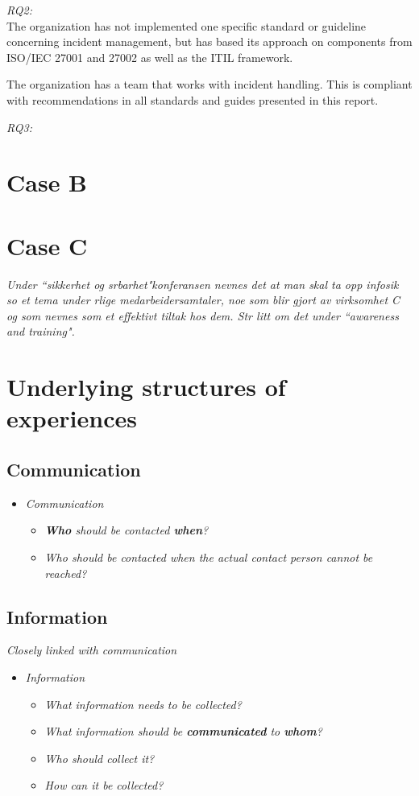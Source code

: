 \textit{RQ2:}\\
The organization has not implemented one specific standard or guideline concerning incident management, but has based its approach on components from ISO/IEC 27001 and 27002 as well as the \ac{ITIL} framework. 

The organization has a team that works with incident handling. This is compliant with recommendations in all standards and guides presented in this report.

\textit{RQ3:}\\

\section{Case B}

\section{Case C}

\textit{Under ``sikkerhet og srbarhet"konferansen nevnes det at man skal ta opp infosik so et tema under rlige medarbeidersamtaler, noe som blir gjort av virksomhet C og som nevnes som et effektivt tiltak hos dem. Str litt om det under ``awareness and training".}

\section{Underlying structures of experiences}
\subsection{Communication}
\begin{itemize}
\item \textit{Communication}
\begin{itemize}
\item \textit{\textbf{Who} should be contacted \textbf{when}?}
\item \textit{Who should be contacted when the actual contact person cannot be reached?}
\end{itemize}
\end{itemize}

\subsection{Information}
\textit{Closely linked with communication}

\begin{itemize}
\item \textit{Information}
\begin{itemize}
\item \textit{What information needs to be collected?}
\item \textit{What information should be \textbf{communicated} to \textbf{whom}?}
\item \textit{Who should collect it?}
\item \textit{How can it be collected?}
\end{itemize}
\end{itemize}

